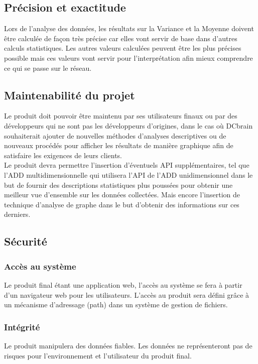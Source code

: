 		\subsection{Précision et exactitude}
			Lors de l'analyse des données, les résultats sur la Variance et la Moyenne doivent être calculée de façon très précise car elles vont servir de base dans d’autres calculs statistiques. Les autres valeurs calculées peuvent être les plus précises possible mais ces valeurs vont servir pour l'interprétation afin mieux comprendre ce qui se passe sur le réseau.

		\subsection{Maintenabilité du projet}
		Le produit doit pouvoir être maintenu par ses utilisateurs finaux ou par des développeurs qui ne sont pas les développeurs d’origines, dans le cas où DCbrain souhaiterait ajouter de nouvelles méthodes d’analyses descriptives ou de nouveaux procédés pour afficher les résultats de manière graphique afin de satisfaire les exigences de leurs clients.\\
		
		Le produit devra permettre l'insertion d'éventuels API supplémentaires, tel que l'ADD multidimensionnelle qui utilisera l'API de l'ADD unidimensionnel dans le but de fournir des descriptions statistiques plus poussées pour obtenir une meilleur vue d'ensemble sur les données collectées. Mais encore l'insertion de technique d'analyse de graphe dans le but d'obtenir des informations sur ces derniers.
		
		\subsection{Sécurité} 
			\subsubsection{Accès au système}
			Le produit final étant une application web, l'accès au système se fera à partir d'un navigateur web pour les utilisateurs. L'accès au produit sera défini grâce à un mécanisme d'adressage (path) dans un système de gestion de fichiers.
			\subsubsection{Intégrité}
			Le produit manipulera des données fiables. Les données ne représenteront pas de risques pour l'environnement et l'utilisateur du produit final.
